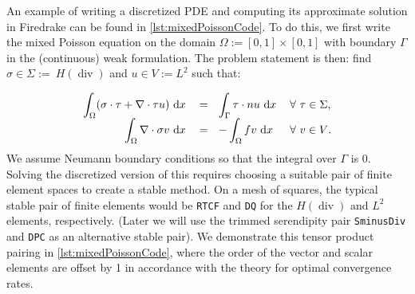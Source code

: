 \documentclass[format=acmsmall,screen,timestamp=false,a4paper]{acmart}
\DeclareMathOperator{\Div}{div}
\newcommand\akg[1]{\textbf{\textcolor[rgb]{.5,0,1}{[Andrew: #1]}}}
\newcommand\lm[1]{\textbf{\textcolor[rgb]{1,0,0.5}{[Lawrence: #1]}}}
\newcommand{\hdiv}{\ensuremath{{H}(\Div)}\xspace}
\begin{document}

An example of writing a discretized PDE and computing its approximate solution in Firedrake can be found in \cref{lst:mixedPoissonCode}. To do this, we first write the mixed Poisson equation on the domain $\Omega := [0, 1] \times [0,1]$ with boundary $\Gamma$ in the (continuous) weak formulation.  The problem statement is then:
find $\sigma \in \Sigma :=~$\hdiv and $u \in V := L^2$ such that:%

\begin{equation*}
\begin{tabular}{rllll}

$\displaystyle\int_\Omega (\sigma \cdot \tau + \nabla\cdot\tau u) \text{ d}x$ & $=~~\displaystyle \int_\Gamma \tau \cdot n u \text{ d}x$ & $\forall~ \tau\in\Sigma$, \\
$\displaystyle\int_\Omega \nabla \cdot \sigma v \text{ d}x$ & $= ~~\displaystyle -\int_\Omega fv \text{ d}x$ & $\forall~ v\in V$.
\end{tabular}
\end{equation*}
We assume Neumann boundary conditions so that the integral over $\Gamma$ is $0$. %
Solving the discretized version of this requires choosing a suitable pair of finite element spaces to create a stable method.  On a mesh of squares, the typical stable pair of finite elements would be \texttt{RTCF} and \texttt{DQ} for the \hdiv and $L^2$ elements, respectively.  (Later we will use the trimmed serendipity pair \texttt{SminusDiv} and \texttt{DPC} as an alternative stable pair).  We demonstrate this tensor product pairing in \cref{lst:mixedPoissonCode}, where the order of the vector and scalar elements are offset by 1 in accordance with the theory for optimal convergence rates.
\end{document}
